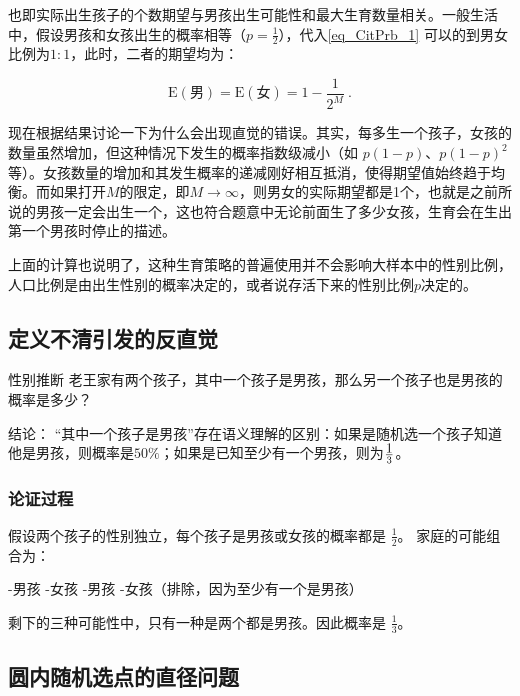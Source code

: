 也即实际出生孩子的个数期望与男孩出生可能性和最大生育数量相关。一般生活中，假设男孩和女孩出生的概率相等（$\displaystyle p = \frac{1}{2}$），代入\autoref{eq_CitPrb_1} 可以的到男女比例为$1:1$，此时，二者的期望均为：

\begin{equation}
\text{E}(\text{男})=\text{E}(\text{女})=1-\frac{1}{2^M}~.
\end{equation}

现在根据结果讨论一下为什么会出现直觉的错误。其实，每多生一个孩子，女孩的数量虽然增加，但这种情况下发生的概率指数级减小（如 $p(1-p)$、$p(1-p)^2$ 等）。女孩数量的增加和其发生概率的递减刚好相互抵消，使得期望值始终趋于均衡。而如果打开$M$的限定，即$M\to\infty$，则男女的实际期望都是1个，也就是之前所说的男孩一定会出生一个，这也符合题意中无论前面生了多少女孩，生育会在生出第一个男孩时停止的描述。

上面的计算也说明了，这种生育策略的普遍使用并不会影响大样本中的性别比例，人口比例是由出生性别的概率决定的，或者说存活下来的性别比例$p$决定的。

\subsection{定义不清引发的反直觉}

\begin{example}{性别推断}
老王家有两个孩子，其中一个孩子是男孩，那么另一个孩子也是男孩的概率是多少？
\end{example}

结论：
“其中一个孩子是男孩”存在语义理解的区别：如果是随机选一个孩子知道他是男孩，则概率是$50\%$；如果是已知至少有一个男孩，则为$\displaystyle 1\over 3$。

\subsubsection{论证过程}
假设两个孩子的性别独立，每个孩子是男孩或女孩的概率都是 $\frac{1}{2}$。
家庭的可能组合为：
\begin{itemize}
-男孩
-女孩
-男孩
-女孩（排除，因为至少有一个是男孩）
\end{itemize}

剩下的三种可能性中，只有一种是两个都是男孩。因此概率是 $\frac{1}{3}$。



\subsection{圆内随机选点的直径问题}


